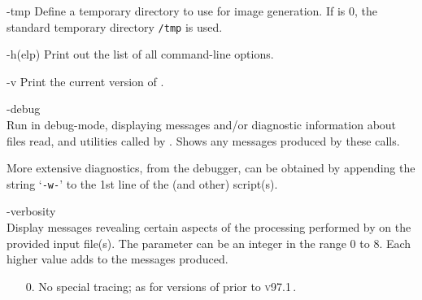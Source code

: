 \begin{htmllist}%
%
%
\begin{changebar}
\item [ -tmp \Meta{path}\label{cs_tmpdir}]
Define a temporary directory to use for image generation.
If  is $0$, the standard temporary directory \texttt{/tmp}
is used.
\end{changebar}
%
%
\item [ -h(elp)\label{cs_optionlist}]
Print out the list of all command-line options.

%
\begin{changebar}
\item [ -v\label{cs_showversion}]
Print the current version of \latextohtml.
\end{changebar}%

%
\begin{changebar}
\item [ -debug\label{cs_debugmode}]
\\
Run in debug-mode, displaying messages and/or diagnostic information
about files read, and utilities called by \latextohtml.
Shows any messages produced by these calls.%

%

More extensive diagnostics, from the \Perl{} debugger,
can be obtained by appending the string `\texttt{-w-}'
to the 1st line of the  (and other) \Perl{} script(s).
\end{changebar}


%
\begin{changebar}
\item [ -verbosity \Meta{num}\label{cs_verbositylevel}]
\\
Display messages revealing certain aspects of the processing
performed by \latextohtml{} on the provided input file(s).
The  parameter can be an integer in the range 0 to 8.
Each higher value adds to the messages produced.

\begin{itemize}
\item[0. ]
No special tracing; as for versions of \latextohtml{} prior to \textsc{v97.1}\,.


\end{itemize}
\end{changebar}
\end{htmllist}
